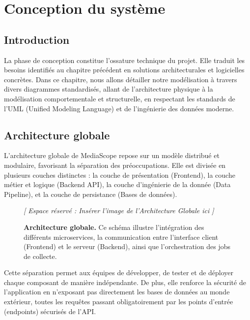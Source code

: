 \documentclass[12pt,a4paper,oneside]{report}
\begin{document}
\chapter{Conception du système}

\section{Introduction}
La phase de conception constitue l'ossature technique du projet. Elle traduit les besoins identifiés au chapitre précédent en solutions architecturales et logicielles concrètes. Dans ce chapitre, nous allons détailler notre modélisation à travers divers diagrammes standardisés, allant de l'architecture physique à la modélisation comportementale et structurelle, en respectant les standards de l'UML (Unified Modeling Language) et de l'ingénierie des données moderne.

\section{Architecture globale}
L'architecture globale de MediaScope repose sur un modèle distribué et modulaire, favorisant la séparation des préoccupations. Elle est divisée en plusieurs couches distinctes : la couche de présentation (Frontend), la couche métier et logique (Backend API), la couche d'ingénierie de la donnée (Data Pipeline), et la couche de persistance (Bases de données).

\begin{figure}[H]
    \centering
    \begin{figbox}
        \vspace{6cm}
        \textcolor{textgray}{\Large \textit{[ Espace réservé : Insérer l'image de l'Architecture Globale ici ]}}
        \vspace{6cm}
    \end{figbox}
    \caption{\textbf{Architecture globale.} Ce schéma illustre l'intégration des différents microservices, la communication entre l'interface client (Frontend) et le serveur (Backend), ainsi que l'orchestration des jobs de collecte.}
    \label{fig:arch_globale}
\end{figure}

Cette séparation permet aux équipes de développer, de tester et de déployer chaque composant de manière indépendante. De plus, elle renforce la sécurité de l'application en n'exposant pas directement les bases de données au monde extérieur, toutes les requêtes passant obligatoirement par les points d'entrée (endpoints) sécurisés de l'API.
\end{document}
